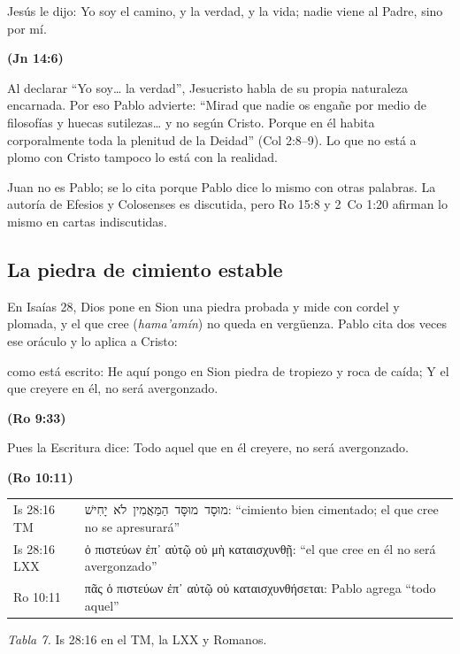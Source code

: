 \documentclass[11pt,letterpaper]{article}
\newcommand{\heb}[1]{\mbox{\foreignlanguage{hebrew}{#1}}}
\newcommand{\grc}[1]{\foreignlanguage{ancientgreek}{#1}}
\newcommand{\fuente}[1]{\par\hfill{\upshape\bfseries\small\textcolor{azul}{#1}}}
\begin{document}
\begin{cita}Jesús le dijo: Yo soy el camino, y la verdad, y la vida; nadie viene al Padre, sino por mí.\fuente{(Jn 14:6)}\end{cita}

Al declarar ``Yo soy\ldots{} la verdad'', Jesucristo habla de su propia naturaleza encarnada. Por eso Pablo advierte: ``Mirad que nadie os engañe por medio de filosofías y huecas sutilezas\ldots{} y no según Cristo. Porque en él habita corporalmente toda la plenitud de la Deidad'' (Col 2:8--9). Lo que no está a plomo con Cristo tampoco lo está con la realidad.

\begin{nota}[Precisión]
Juan no es Pablo; se lo cita porque Pablo dice lo mismo con otras palabras. La autoría de Efesios y Colosenses es discutida, pero Ro 15:8 y 2~Co 1:20 afirman lo mismo en cartas indiscutidas.
\end{nota}

\subsection{La piedra de cimiento estable}\label{sec:piedra}
En Isaías 28, Dios pone en Sion una piedra probada y mide con cordel y plomada, y el que cree (\emph{hama'amín}) no queda en vergüenza. Pablo cita dos veces ese oráculo y lo aplica a Cristo:

\begin{cita}como está escrito: He aquí pongo en Sion piedra de tropiezo y roca de caída; Y el que creyere en él, no será avergonzado.\fuente{(Ro 9:33)}\end{cita}
\begin{cita}Pues la Escritura dice: Todo aquel que en él creyere, no será avergonzado.\fuente{(Ro 10:11)}\end{cita}

\begin{center}\small\renewcommand{\arraystretch}{1.2}
\begin{tabular}{@{}L{2.4cm}L{12.0cm}@{}}
\toprule
Is 28:16 TM & \heb{מוּסָד מוּסָּד הַמַּאֲמִין לֹא יָחִישׁ}: ``cimiento bien cimentado; el que cree no se apresurará'' \\
Is 28:16 LXX & \grc{ὁ πιστεύων ἐπ᾽ αὐτῷ οὐ μὴ καταισχυνθῇ}: ``el que cree en él no será avergonzado'' \\
Ro 10:11 & \grc{πᾶς ὁ πιστεύων ἐπ᾽ αὐτῷ οὐ καταισχυνθήσεται}: Pablo agrega ``todo aquel'' \\
\bottomrule
\end{tabular}\par
{\footnotesize\color{gris}\textit{Tabla 7.} Is 28:16 en el TM, la LXX y Romanos.}
\end{center}
\end{document}

